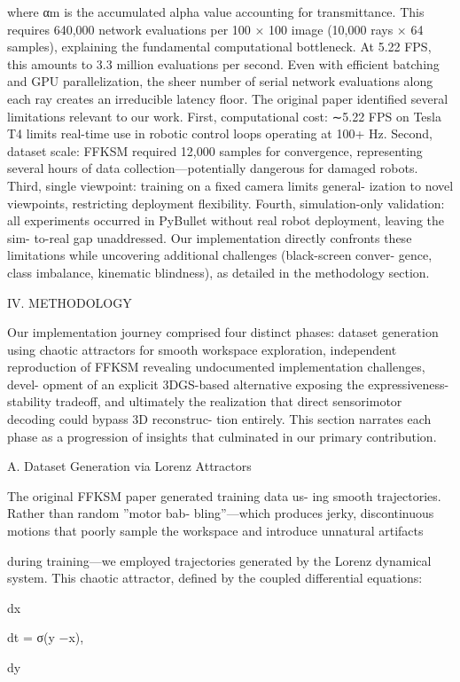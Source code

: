 \documentclass[10pt,twocolumn,letterpaper]{article}
\begin{document}
where αm is the accumulated alpha value accounting for transmittance. This requires 640,000 network evaluations per 100 × 100 image (10,000 rays × 64 samples), explaining the fundamental computational bottleneck. At 5.22 FPS, this amounts to 3.3 million evaluations per second. Even with efficient batching and GPU parallelization, the sheer number of serial network evaluations along each ray creates an irreducible latency floor. The original paper identified several limitations relevant to our work. First, computational cost: ∼5.22 FPS on Tesla T4 limits real-time use in robotic control loops operating at 100+ Hz. Second, dataset scale: FFKSM required 12,000 samples for convergence, representing several hours of data collection—potentially dangerous for damaged robots. Third, single viewpoint: training on a fixed camera limits general- ization to novel viewpoints, restricting deployment flexibility. Fourth, simulation-only validation: all experiments occurred in PyBullet without real robot deployment, leaving the sim- to-real gap unaddressed. Our implementation directly confronts these limitations while uncovering additional challenges (black-screen conver- gence, class imbalance, kinematic blindness), as detailed in the methodology section.

IV. METHODOLOGY

Our implementation journey comprised four distinct phases: dataset generation using chaotic attractors for smooth workspace exploration, independent reproduction of FFKSM revealing undocumented implementation challenges, devel- opment of an explicit 3DGS-based alternative exposing the expressiveness-stability tradeoff, and ultimately the realization that direct sensorimotor decoding could bypass 3D reconstruc- tion entirely. This section narrates each phase as a progression of insights that culminated in our primary contribution.

A. Dataset Generation via Lorenz Attractors

The original FFKSM paper generated training data us- ing smooth trajectories. Rather than random ”motor bab- bling”—which produces jerky, discontinuous motions that poorly sample the workspace and introduce unnatural artifacts

during training—we employed trajectories generated by the Lorenz dynamical system. This chaotic attractor, defined by the coupled differential equations:

dx

dt = σ(y −x),

dy
\end{document}
